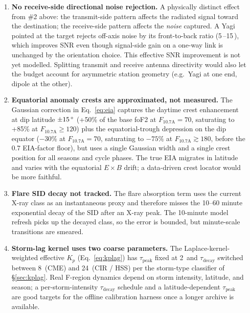 \documentclass[11pt,a4paper]{article}
\newcommand{\SI}[2]{#1\,\text{#2}}
\newcommand{\dB}{\text{dB}}
\newcommand{\hour}{\text{h}}
\newcommand{\degree}{\ensuremath{{}^\circ}}
\begin{document}
\begin{enumerate}[leftmargin=*]
  \item \textbf{No receive-side directional noise rejection.}  A
        physically distinct effect from \#2 above: the
        transmit-side pattern affects the radiated signal toward
        the destination; the receive-side pattern affects the
        \emph{noise} captured.  A Yagi pointed at the target
        rejects off-axis noise by its front-to-back ratio
        (\SI{5}{\dB}--\SI{15}{\dB}), which improves SNR even
        though signal-side gain on a one-way link is unchanged
        by the orientation choice.  This effective SNR improvement
        is not yet modelled.  Splitting transmit and receive
        antenna directivity would also let the budget account for
        asymmetric station geometry (e.g.\ Yagi at one end, dipole
        at the other).

  \item \textbf{Equatorial anomaly crests are approximated, not
        measured.}  The Gaussian correction in
        Eq.~\ref{eq:eia} captures the daytime crest enhancement at
        dip latitude $\pm \SI{15}{\degree}$ (+50\% of the base foF2
        at $F_{10.7\text{A}} = 70$, saturating to +85\% at
        $F_{10.7\text{A}} \ge \!120$) plus the equatorial-trough
        depression on the dip equator ($-30\%$ at $F_{10.7\text{A}}
        = 70$, saturating to $-75\%$ at $F_{10.7\text{A}}
        \gtrsim 180$, before the $0.7$ EIA-factor floor),
        but uses a single Gaussian width and a single crest position
        for all seasons and cycle phases.
        The true EIA migrates in latitude and varies with the
        equatorial $E\times B$ drift; a data-driven crest locator
        would be more faithful.

  \item \textbf{Flare SID decay not tracked.}  The flare absorption
        term uses the current X-ray class as an instantaneous proxy
        and therefore misses the 10--60 minute exponential decay of
        the SID after an X-ray peak.  The 10-minute model refresh
        picks up the decayed class, so the error is bounded, but
        minute-scale transitions are smeared.

  \item \textbf{Storm-lag kernel uses two coarse parameters.}  The
        Laplace-kernel-weighted effective $K_p$
        (Eq.~\ref{eq:kplag}) has $\tau_{\text{peak}}$ fixed at
        \SI{2}{\hour} and $\tau_{\text{decay}}$ switched between
        \SI{8}{\hour} (CME) and \SI{24}{\hour} (CIR / HSS) per the
        storm-type classifier of \S\ref{sec:kplag}.  Real F-region
        dynamics depend on storm intensity, latitude, and season;
        a per-storm-intensity $\tau_{\text{decay}}$ schedule and a
        latitude-dependent $\tau_{\text{peak}}$ are good targets
        for the offline calibration harness once a longer archive
        is available.


\end{enumerate}
\end{document}
